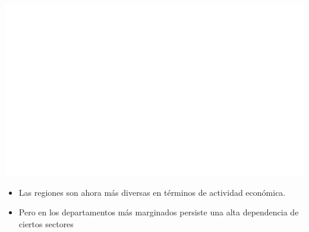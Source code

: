 \documentclass[aspectratio=169]{beamer}
\begin{document}
    \begin{slide}{8} 
                      \begin{imagecolumn}
                \includegraphics[width=\columnwidth]{img/var_300_map.png}
            \end{imagecolumn}
            \begin{textcolumn}
                \begin{itemize}
                    \item Las regiones son ahora más diversas en términos de actividad económica.
                    \item Pero en los departamentos más marginados persiste una alta dependencia de ciertos sectores
                \end{itemize}
            \end{textcolumn}

    \printcolumns
    \end{slide}
    
\end{document}

